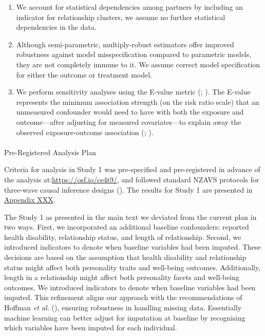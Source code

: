 \documentclass[
  single column]{article}
\makeatletter
\let\oldparagraph\paragraph
\renewcommand{\paragraph}{
    \@ifstar
      \xxxParagraphStar
      \xxxParagraphNoStar
  }
\newcommand{\xxxParagraphStar}[1]{\oldparagraph*{#1}\mbox{}}
\newcommand{\xxxParagraphNoStar}[1]{\oldparagraph{#1}\mbox{}}
\providecommand{\tightlist}{%
  \setlength{\itemsep}{0pt}\setlength{\parskip}{0pt}}\usepackage{longtable,booktabs,array}
\makeatother
\begin{document}
\begin{enumerate}
\def\labelenumi{\arabic{enumi}.}
\tightlist
\item
  We account for statistical dependencies among partners by including an
  indicator for relationship clusters, we assume no further statistical
  dependencies in the data.
\item
  Although semi-parametric, multiply-robust estimators offer improved
  robustness against model misspecification compared to parametric
  models, they are not completely immune to it. We assume correct model
  specification for either the outcome or treatment model.
\item
  We perform sensitivity analyses using the E-value metric
  (;
  ). The
  E-value represents the minimum association strength (on the risk ratio
  scale) that an unmeasured confounder would need to have with both the
  exposure and outcome---after adjusting for measured covariates---to
  explain away the observed exposure-outcome association
  (;
  ).
\end{enumerate}

\paragraph{Pre-Registered Analysis
Plan}\label{pre-registered-analysis-plan}

Criteria for analysis in Study 1 was pre-specified and pre-registered in
advance of the analysis at:\url{https://osf.io/ce4t9/}, and followed
standard NZAVS protocols for three-wave causal inference designs
(). The results for
Study 1 are presented in \href{appendix-XXX}{Appendix XXX}.

The Study 1 as presented in the main text we deviated from the current
plan in two ways. First, we incorporated an additional baseline
confounders: reported health disability, relationship status, and length
of relationship. Second, we introduced indicators to denote when
baseline variables had been imputed. These decisions are based on the
assumption that health disability and relationship status might affect
both personality traits and well-being outcomes. Additionally, length in
a relationship might affect both personality facets and well-being
outcomes. We introduced indicators to denote when baseline variables had
been imputed. This refinement aligns our approach with the
recommendations of Hoffman \emph{et al.}
(), ensuring robustness in handling
missing data. Essentially machine learning can better adjust for
imputation at baseline by recognising which variables have been imputed
for each individual.
\end{document}
